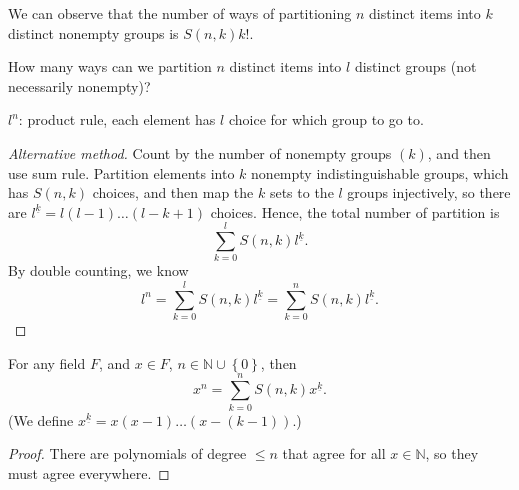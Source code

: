 We can observe that the number of ways of partitioning \(n\) distinct items into \(k\) distinct nonempty groups is \(S(n, k) k!\). 

\begin{question}
    How many ways can we partition \(n\) distinct items into \(l\) distinct groups (not necessarily nonempty)?
\end{question}
\begin{answer}
    \(l^n\): product rule, each element has \(l\) choice for which group to go to.   
\end{answer}
\begin{proof}[Alternative method]
    Count by the number of nonempty groups \((k)\), and then use sum rule. Partition elements into \(k\) nonempty indistinguishable groups, which has \(S(n, k)\) choices, and then map the \(k\) sets to the \(l\) groups injectively, so there are \(l^{\underline{k}} = l(l - 1) \dots (l - k + 1)\) choices. Hence, the total number of partition is 
    \[
        \sum_{k=0}^l S(n, k) l^{\underline{k}}.
    \]
        By double counting, we know 
    \[
        l^n = \sum_{k=0}^l S(n, k) l^{\underline{k}} = \sum_{k=0}^n S(n, k) l^{\underline{k}}. 
    \]     
\end{proof}
\begin{proposition} \label{prop: x^n is sum S(n,k)x^underline(k) is true for any field}
    For any field \(F\), and \(x \in F\), \(n \in \mathbb{N} \cup \left\{ 0 \right\} \), then 
    \[
        x^n = \sum_{k=0}^n S(n, k) x^{\underline{k}}. 
    \]   
    (We define \(x^{\underline{k}} = x(x-1) \dots (x - (k-1))\).)
\end{proposition}

\begin{proof}
    There are polynomials of degree \(\le n\) that agree for all \(x \in \mathbb{N} \), so they must agree everywhere.  
\end{proof}

